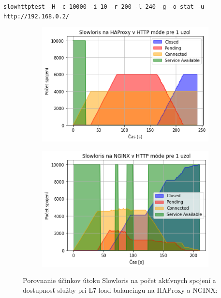\documentclass[12pt, a4paper]{article}
\begin{document}
\begin{lrbox}{\shield}
\verb|slowhttptest -H -c 10000 -i 10 -r 200 -l 240 -g -o stat -u http://192.168.0.2/|
\end{lrbox}
\begin{figure}[h!]
	\centering
	\begin{subfigure}[t]{.48\textwidth}
  		\centering
  		\includegraphics[width=\textwidth]{images/Haproxy-1-http.png}
	\end{subfigure}
	\begin{subfigure}[t]{.48\textwidth}
  		\centering
  		\includegraphics[width=\textwidth]{images/Nginx-1-http.png}
	\end{subfigure}
	\caption{Porovnanie účinkov útoku Slowloris na počet aktívnych spojení a dostupnosť služby
	pri L7 load balancingu na HAProxy a NGINX:\\ 		
	\usebox{\shield}}
\end{figure}
\end{document}
